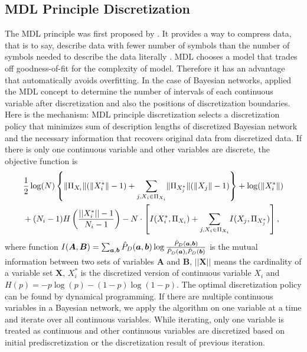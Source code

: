 {\subsection{MDL Principle Discretization}
\label{MDL}
The MDL principle was first proposed by \cite{MDL_1978}. It provides a way to compress data, that is to say, describe data with fewer number of symbols than the number of symbols needed to describe the data literally \citep{Grunwald_2009}. MDL chooses a model that trades off goodness-of-fit for the complexity of model. Therefore it has an advantage that automatically avoids overfitting. In the case of Bayesian networks, \cite{Friedman_1996} applied the MDL concept to determine the number of intervals of each continuous variable after discretization and also the positions of discretization boundaries. Here is the mechanism: MDL principle discretization selects a discretization policy that minimizes sum of description lengths of discretized Bayesian network and the necessary information that recovers original data from discretized data. If there is only one continuous variable and other variables are discrete, the objective function is
\begin{equation}
\begin{aligned}
&{1 \over 2} \log(N) \left\lbrace  \lVert \Pi_{X_i} \rVert (\lVert X^*_i \rVert - 1) +
 {\sum_{j,X_i \in \Pi_{X_i}}} \lVert \Pi_{X^*_j} \rVert (\lVert X_j \rVert - 1) \right\rbrace + \log(\lVert {X^*_i} \rVert) \\
& + (N_i-1) H \left( {{||X^*_i|| - 1}\over{N_i -1}}  \right) -N \cdot \left[ I(X^*_i,\Pi_{X_i}) + {\sum_{j,X_i \in \Pi_{X_i}}} I(X_j, \Pi_{X^*_j}) \right],
\end{aligned}
\end{equation}
where function $I(\boldsymbol{A},\boldsymbol{B}) = \sum_{\boldsymbol{a},\boldsymbol{b}} \hat{P}_D (\boldsymbol{a},\boldsymbol{b}) \log {{\hat{P}_D (\boldsymbol{a},\boldsymbol{b})}\over{\hat{P}_D (\boldsymbol{a}),\hat{P}_D (\boldsymbol{b})}}$ is the mutual information between two sets of variables $\boldsymbol{A}$ and $\boldsymbol{B}$, $||\boldsymbol{X}||$ means the cardinality of a variable set $\boldsymbol{X}$, $X^*_i$ is the discretized version of continuous variable $X_i$ and $H(p) = -p \log(p) - (1-p) \log(1-p)$. The optimal discretization policy can be found by dynamical programming. If there are multiple continuous variables in a Bayesian network, we apply the algorithm on one variable at a time and iterate over all continuous variables. While iterating, only one variable is treated as continuous and other continuous variables are discretized based on initial prediscretization or the discretization result of previous iteration.

}

